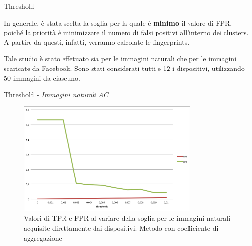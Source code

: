 \begin{tframe}{Threshold}

In generale, è stata scelta la soglia per la quale è \textbf{minimo} il valore di FPR, poiché la priorità è minimizzare il numero di falsi positivi all'interno dei clusters. A partire da questi, infatti, verranno calcolate le fingerprints.

\vspace{0.3cm}

Tale studio è stato effetuato sia per le immagini naturali che per le immagini scaricate da Facebook. Sono stati considerati tutti e 12 i dispositivi, utilizzando 50 immagini da ciascuno.

\end{tframe}

\begin{tframe}{Threshold \emph{- Immagini naturali AC}}

\begin{figure}[h]
\begin{center}
\includegraphics[width=0.8\textwidth]{../images/soglia_imgnat_AC.png}
\end{center}
  \caption{Valori di TPR e FPR al variare della soglia per le immagini naturali acquisite direttamente dai dispositivi. Metodo con coefficiente di aggregazione.}
\label{fig:soglia AC}
\end{figure}

\end{tframe}

